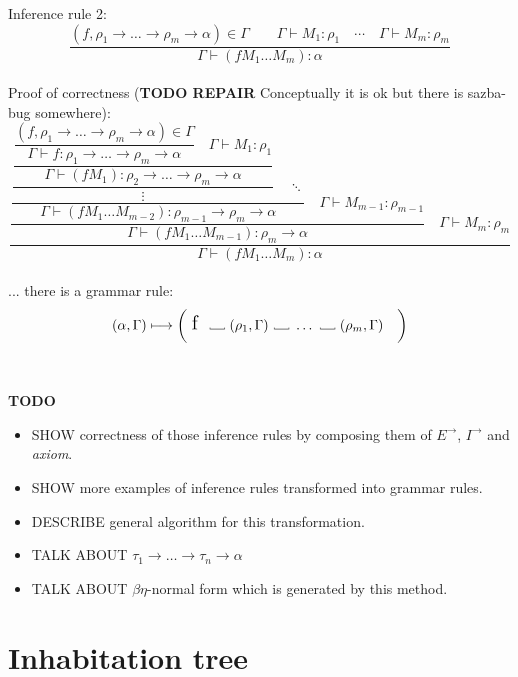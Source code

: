 \documentclass[12pt,a4paper]{report}
\newcommand\Vtextvisiblespace[1][.3em]{%
  \mbox{\kern.06em\vrule height.3ex}%
  \vbox{\hrule width#1}%
  \hbox{\vrule height.3ex}}
\begin{document}
Inference rule 2: 
\[
	\frac{ (f , \rho_1 \rightarrow \dots \rightarrow \rho_m \rightarrow \alpha ) \in \Gamma \qquad
	       \Gamma \vdash M_1 : \rho_1 \quad
	       \dotsm \quad
	       \Gamma \vdash M_m : \rho_m        
	      }
	     {\Gamma \vdash (f M_1 \dots M_m) : \alpha}
\]
\\
Proof of correctness (\textbf{TODO REPAIR} Conceptually it is ok but there is sazba-bug somewhere): 
\[
   \dfrac
     {\dfrac
      {\dfrac
       {\dfrac         
         {\dfrac  
          {\dfrac
           {\boxed{(f , \rho_1 \rightarrow \dots \rightarrow \rho_m \rightarrow \alpha ) \in \Gamma}}
           {\Gamma \vdash f : \rho_1 \rightarrow \dots \rightarrow \rho_m \rightarrow \alpha}
           \quad
           \boxed{\Gamma \vdash M_1 : \rho_1} }
          {\Gamma \vdash (f M_1) : \rho_2 \rightarrow \dots \rightarrow \rho_m \rightarrow \alpha }
          }{\vdots} 
         \quad 
         \ddots }
       {\Gamma \vdash (f M_1 \dots M_{m-2}) : \rho_{m-1} \rightarrow \rho_m \rightarrow \alpha}
       \quad
       \boxed{\Gamma \vdash M_{m-1} : \rho_{m-1}}  }
      {\Gamma \vdash (f M_1 \dots M_{m-1}) : \rho_m \rightarrow \alpha}       
      \quad 
      \boxed{\Gamma \vdash M_m : \rho_m} }
	 {\Gamma \vdash (f M_1 \dots M_m) : \alpha}
\]
\\
... there is a grammar rule:
\[ 
	( \alpha , \Gamma )  \longmapsto
	\bigg( \mbox{ {\Large f }}
	  \mbox{ \Vtextvisiblespace[1em] } 
	  ( \rho_1 , \Gamma )
	  \mbox{ \Vtextvisiblespace[1em] } 
	  \dots
	  \mbox{ \Vtextvisiblespace[1em] } 
	  ( \rho_m , \Gamma )
	  \quad \bigg)
\]
\\\\
\textbf{TODO} 
\begin{itemize}
	\item SHOW correctness of those inference rules by composing them of 
		  $E^{\rightarrow}$, $I^{\rightarrow}$ and \textit{axiom}.
	\item SHOW more examples of inference rules transformed into grammar rules.
	\item DESCRIBE general algorithm for this transformation.
	\item TALK ABOUT $\tau_1 \rightarrow \dots \rightarrow \tau_n \rightarrow \alpha$ 
	\item TALK ABOUT $\beta \eta$-normal form which is generated by this method.
\end{itemize}


\newpage
\section{Inhabitation tree}
\end{document}
